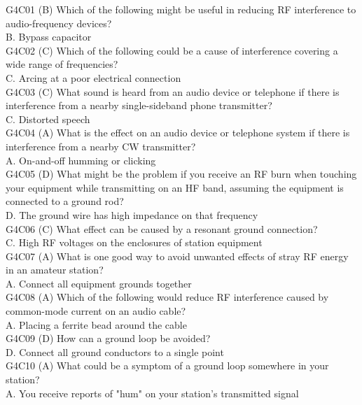 \documentclass[12pt,letterpaper]{report}
\begin{document}
G4C01 (B) Which of the following might be useful in reducing RF interference to audio-frequency devices?\\
B. Bypass capacitor\\

G4C02 (C) Which of the following could be a cause of interference covering a wide range of frequencies? \\
C. Arcing at a poor electrical connection \\

G4C03 (C) What sound is heard from an audio device or telephone if there is interference from a nearby single-sideband phone transmitter?\\
C. Distorted speech\\

G4C04 (A) What is the effect on an audio device or telephone system if there is interference from a nearby CW transmitter?\\
A. On-and-off humming or clicking\\

G4C05 (D)  What might be the problem if you receive an RF burn when touching your equipment while transmitting on an HF band, assuming the equipment is connected to a ground rod?\\
D. The ground wire has high impedance on that frequency\\

G4C06 (C) What effect can be caused by a resonant ground connection?\\
C. High RF voltages on the enclosures of station equipment\\

G4C07 (A) What is one good way to avoid unwanted effects of stray RF energy in an amateur station?\\
A. Connect all equipment grounds together \\

G4C08 (A) Which of the following would reduce RF interference caused by common-mode current on an audio cable?\\
A. Placing a ferrite bead around the cable\\

G4C09 (D) How can a ground loop be avoided?\\
D. Connect all ground conductors to a single point\\

G4C10 (A) What could be a symptom of a ground loop somewhere in your station?\\
A. You receive reports of "hum" on your station's transmitted signal\\
\end{document}
